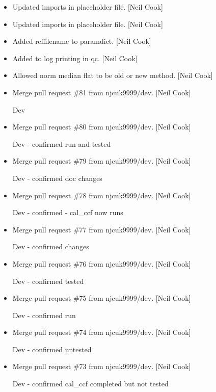 \documentclass[a4paper,10pt,english]{report}
\begin{document}
\begin{itemize}
\item {} 
Updated imports in placeholder file. {[}Neil Cook{]}

\item {} 
Updated imports in placeholder file. {[}Neil Cook{]}

\item {} 
Added reffilename to paramdict. {[}Neil Cook{]}

\item {} 
Added to log printing in qc. {[}Neil Cook{]}

\item {} 
Allowed norm median flat to be old or new method. {[}Neil Cook{]}

\item {} 
Merge pull request \#81 from njcuk9999/dev. {[}Neil Cook{]}

Dev

\item {} 
Merge pull request \#80 from njcuk9999/dev. {[}Neil Cook{]}

Dev - confirmed run and tested

\item {} 
Merge pull request \#79 from njcuk9999/dev. {[}Neil Cook{]}

Dev - confirmed doc changes

\item {} 
Merge pull request \#78 from njcuk9999/dev. {[}Neil Cook{]}

Dev - confirmed - cal\_ccf now runs

\item {} 
Merge pull request \#77 from njcuk9999/dev. {[}Neil Cook{]}

Dev - confirmed changes

\item {} 
Merge pull request \#76 from njcuk9999/dev. {[}Neil Cook{]}

Dev - confirmed tested

\item {} 
Merge pull request \#75 from njcuk9999/dev. {[}Neil Cook{]}

Dev - confirmed run

\item {} 
Merge pull request \#74 from njcuk9999/dev. {[}Neil Cook{]}

Dev - confirmed untested

\item {} 
Merge pull request \#73 from njcuk9999/dev. {[}Neil Cook{]}

Dev - confirmed cal\_ccf completed but not tested


\end{itemize}
\end{document}
